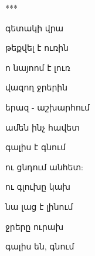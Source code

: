 ***


գետակի վրա


թեքվել է ուռին

ո նայոոմ   է լուռ


վազող ջրերին

երազ - աշխարհում


ամեն ինչ հավետ


գալիս է գնում



 ու ցնդում անհետ:


  ու գլուխը  կախ

  նա լաց է լինում


  ջրերը ուրախ


  գալիս են, գնում

